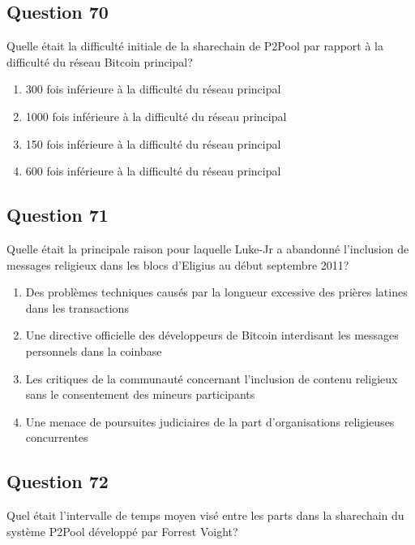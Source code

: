 \documentclass[12pt,a4paper]{article}
\begin{document}
\bigskip


\subsection*{Question 70}
Quelle était la difficulté initiale de la sharechain de P2Pool par rapport à la difficulté du réseau Bitcoin principal?

\begin{enumerate}[label=\Alph*., leftmargin=*]
\item 300 fois inférieure à la difficulté du réseau principal
\item 1000 fois inférieure à la difficulté du réseau principal
\item 150 fois inférieure à la difficulté du réseau principal
\item 600 fois inférieure à la difficulté du réseau principal
\end{enumerate}

\bigskip


\subsection*{Question 71}
Quelle était la principale raison pour laquelle Luke-Jr a abandonné l'inclusion de messages religieux dans les blocs d'Eligius au début septembre 2011?

\begin{enumerate}[label=\Alph*., leftmargin=*]
\item Des problèmes techniques causés par la longueur excessive des prières latines dans les transactions
\item Une directive officielle des développeurs de Bitcoin interdisant les messages personnels dans la coinbase
\item Les critiques de la communauté concernant l'inclusion de contenu religieux sans le consentement des mineurs participants
\item Une menace de poursuites judiciaires de la part d'organisations religieuses concurrentes
\end{enumerate}

\bigskip


\subsection*{Question 72}
Quel était l'intervalle de temps moyen visé entre les parts dans la sharechain du système P2Pool développé par Forrest Voight?
\end{document}
